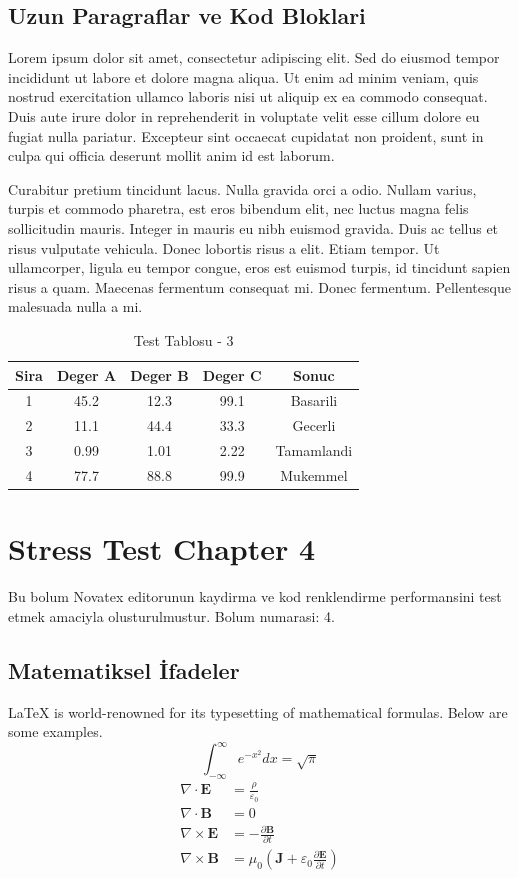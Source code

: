 \documentclass[12pt,a4paper]{article}
\begin{document}
\subsection{Uzun Paragraflar ve Kod Bloklari}
Lorem ipsum dolor sit amet, consectetur adipiscing elit. Sed do eiusmod tempor incididunt ut labore et dolore magna aliqua. Ut enim ad minim veniam, quis nostrud exercitation ullamco laboris nisi ut aliquip ex ea commodo consequat. Duis aute irure dolor in reprehenderit in voluptate velit esse cillum dolore eu fugiat nulla pariatur. Excepteur sint occaecat cupidatat non proident, sunt in culpa qui officia deserunt mollit anim id est laborum.

Curabitur pretium tincidunt lacus. Nulla gravida orci a odio. Nullam varius, turpis et commodo pharetra, est eros bibendum elit, nec luctus magna felis sollicitudin mauris. Integer in mauris eu nibh euismod gravida. Duis ac tellus et risus vulputate vehicula. Donec lobortis risus a elit. Etiam tempor. Ut ullamcorper, ligula eu tempor congue, eros est euismod turpis, id tincidunt sapien risus a quam. Maecenas fermentum consequat mi. Donec fermentum. Pellentesque malesuada nulla a mi.

\begin{table}[h!]
\centering
\begin{tabular}{|c|c|c|c|c|}
\hline
\textbf{Sira} & \textbf{Deger A} & \textbf{Deger B} & \textbf{Deger C} & \textbf{Sonuc} \\
\hline
1 & 45.2 & 12.3 & 99.1 & Basarili \\
2 & 11.1 & 44.4 & 33.3 & Gecerli \\
3 & 0.99 & 1.01 & 2.22 & Tamamlandi \\
4 & 77.7 & 88.8 & 99.9 & Mukemmel \\
\hline
\end{tabular}
\caption{Test Tablosu - 3}
\end{table}

\newpage
\section{Stress Test Chapter 4}
Bu bolum Novatex editorunun kaydirma ve kod renklendirme performansini test etmek amaciyla olusturulmustur. Bolum numarasi: 4.

\subsection{Matematiksel İfadeler}
\LaTeX{} is world-renowned for its typesetting of mathematical formulas. Below are some examples.
\begin{equation}
\int_{-\infty}^{\infty} e^{-x^2} dx = \sqrt{\pi}
\end{equation}
\begin{align}
\nabla \cdot \mathbf{E} &= \frac{\rho}{\varepsilon_0} \\
\nabla \cdot \mathbf{B} &= 0 \\
\nabla \times \mathbf{E} &= -\frac{\partial \mathbf{B}}{\partial t} \\
\nabla \times \mathbf{B} &= \mu_0\left(\mathbf{J} + \varepsilon_0 \frac{\partial \mathbf{E}}{\partial t}\right)
\end{align}
\end{document}
